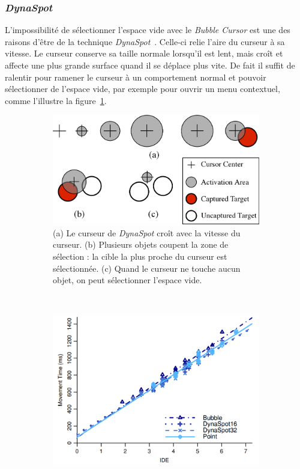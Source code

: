 	\subsubsection{\emph{DynaSpot}}
	L'impossibilité de sélectionner l'espace vide avec le \emph{Bubble Cursor} est une des raisons d'être de la technique \emph{DynaSpot}~\cite{chapuis2009dynaspot}. Celle-ci relie l'aire du curseur à sa vitesse. Le curseur conserve sa taille normale lorsqu'il est lent, mais croît et affecte une plus grande surface quand il se déplace plus vite. De fait il suffit de ralentir pour ramener le curseur à un comportement \og normal \fg{} et pouvoir sélectionner de l'espace vide, par exemple pour ouvrir un menu contextuel, comme l'illustre la figure~\ref{fig:dynaSpot}.
	
	\begin{figure}[htbp]
		\begin{subfigure}[t]{0.54\textwidth}
			\centering
			\includegraphics[width=\textwidth]{figures/ch2/dynaSpot}
			\caption{(a) Le curseur de \emph{DynaSpot} croît avec la vitesse du curseur. (b) Plusieurs objets coupent la zone de sélection : la cible la plus proche du curseur est sélectionnée. (c) Quand le curseur ne touche aucun objet, on peut sélectionner l'espace vide.}
			\label{fig:dynaSpot}
		\end{subfigure}
		~
		\begin{subfigure}[t]{0.44\textwidth}
			\centering
			\includegraphics[width=\textwidth]{figures/ch2/dynaResults}

\end{subfigure}
\end{figure}
